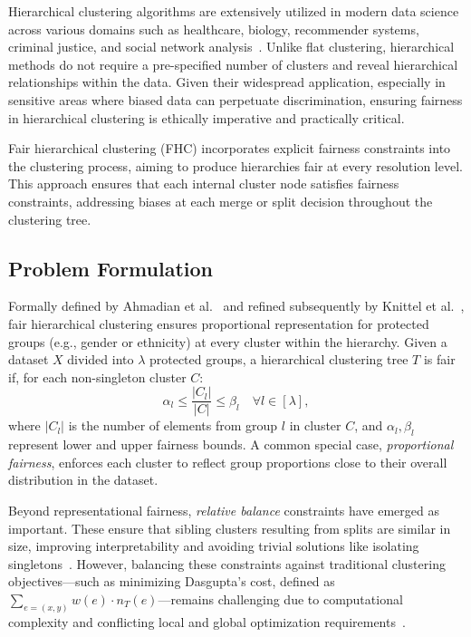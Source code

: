 Hierarchical clustering algorithms are extensively utilized in modern
data science across various domains such as healthcare, biology,
recommender systems, criminal justice, and social network
analysis~\cite{chhabra2023}. Unlike flat clustering, hierarchical
methods do not require a pre-specified number of clusters and reveal
hierarchical relationships within the data. Given their widespread
application, especially in sensitive areas where biased data can
perpetuate discrimination, ensuring fairness in hierarchical
clustering is ethically imperative and practically critical.

Fair hierarchical clustering (FHC) incorporates explicit fairness
constraints into the clustering process, aiming to produce
hierarchies fair at every resolution level. This approach ensures
that each internal cluster node satisfies fairness constraints,
addressing biases at each merge or split decision throughout the
clustering tree.

\subsection{Problem Formulation}

Formally defined by Ahmadian et al.~\cite{ahmadian2020} and refined
subsequently by Knittel et al.~\cite{knittel2023}, fair hierarchical
clustering ensures proportional representation for protected groups
(e.g., gender or ethnicity) at every cluster within the hierarchy.
Given a dataset $X$ divided into $\lambda$ protected groups, a
hierarchical clustering tree $T$ is fair if, for each non-singleton cluster $C$:
\[
  \alpha_l \leq \frac{|C_l|}{|C|} \leq \beta_l \quad \forall l \in [\lambda],
\]
where $|C_l|$ is the number of elements from group $l$ in cluster
$C$, and $\alpha_l, \beta_l$ represent lower and upper fairness
bounds. A common special case, \emph{proportional fairness}, enforces
each cluster to reflect group proportions close to their overall
distribution in the dataset.

Beyond representational fairness, \emph{relative balance} constraints
have emerged as important. These ensure that sibling clusters
resulting from splits are similar in size, improving interpretability
and avoiding trivial solutions like isolating
singletons~\cite{knittel2023}. However, balancing these constraints
against traditional clustering objectives—such as minimizing
Dasgupta’s cost, defined as \( \sum_{e=(x,y)} w(e) \cdot n_T(e)
\)—remains challenging due to computational complexity and
conflicting local and global optimization requirements~\cite{knittel2023}.

